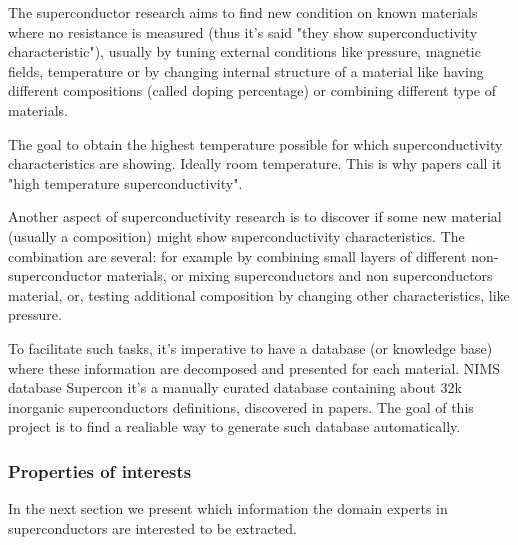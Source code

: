 \documentclass{article}
\begin{document}
The superconductor research aims to find new condition on known materials where no resistance is measured (thus it's said "they show superconductivity characteristic"), usually by tuning external conditions like pressure, magnetic fields, temperature or by changing internal structure of a material like having different compositions (called doping percentage) or combining different type of materials.

The goal to obtain the highest temperature possible for which superconductivity characteristics are showing. Ideally room temperature. This is why papers call it "high temperature superconductivity". 

Another aspect of superconductivity research is to discover if some new material (usually a composition) might show superconductivity characteristics. The combination are several: for example by combining small layers of different non-superconductor materials, or mixing superconductors and non superconductors material, or, testing additional composition by changing other characteristics, like pressure. 

To facilitate such tasks, it's imperative to have a database (or knowledge base) where these information are decomposed and presented for each material. 
NIMS database Supercon it's a manually curated database containing about 32k inorganic superconductors definitions, discovered in papers. 
The goal of this project is to find a realiable way to generate such database automatically. 

\subsubsection{Properties of interests}
In the next section we present which information the domain experts in superconductors are interested to be extracted. 
\end{document}
